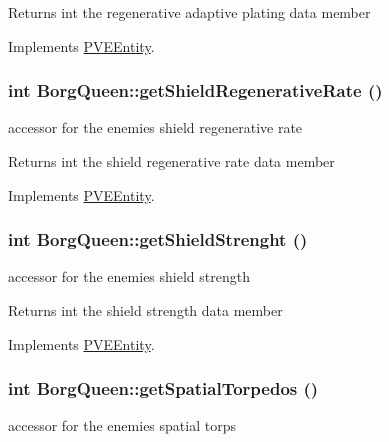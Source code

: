 \begin{DoxyReturn}{Returns}
int the regenerative adaptive plating data member 
\end{DoxyReturn}


Implements \hyperlink{classPVEEntity}{PVEEntity}.

\hypertarget{classBorgQueen_ab7c7d1068ca9e031ab4c742d44150784}{
\subsubsection[{getShieldRegenerativeRate}]{\setlength{\rightskip}{0pt plus 5cm}int BorgQueen::getShieldRegenerativeRate ()}}
\label{d6/d8d/classBorgQueen_ab7c7d1068ca9e031ab4c742d44150784}
accessor for the enemies shield regenerative rate

\begin{DoxyReturn}{Returns}
int the shield regenerative rate data member 
\end{DoxyReturn}


Implements \hyperlink{classPVEEntity}{PVEEntity}.

\hypertarget{classBorgQueen_aa36f69293ff2c3cb5df255fee9b2d9e8}{
\subsubsection[{getShieldStrenght}]{\setlength{\rightskip}{0pt plus 5cm}int BorgQueen::getShieldStrenght ()}}
\label{d6/d8d/classBorgQueen_aa36f69293ff2c3cb5df255fee9b2d9e8}
accessor for the enemies shield strength

\begin{DoxyReturn}{Returns}
int the shield strength data member 
\end{DoxyReturn}


Implements \hyperlink{classPVEEntity}{PVEEntity}.

\hypertarget{classBorgQueen_a9f7a18df2032943b5211d6fa6b5a78d9}{
\subsubsection[{getSpatialTorpedos}]{\setlength{\rightskip}{0pt plus 5cm}int BorgQueen::getSpatialTorpedos ()}}
\label{d6/d8d/classBorgQueen_a9f7a18df2032943b5211d6fa6b5a78d9}
accessor for the enemies spatial torps


